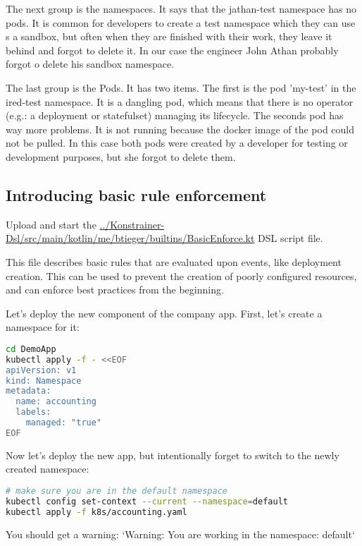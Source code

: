 The next group is the namespaces. It says that the jathan-test namespace has no pods. It is common for developers to create a test namespace which they can use s a sandbox, but often when they are finished with their work, they leave it behind and forgot to delete it. In our case the engineer John Athan probably forgot o delete his sandbox namespace.

The last group is the Pods. It has two items. The first is the pod 'my-test' in the ired-test namespace. It is a dangling pod, which means that there is no operator (e.g.: a deployment or statefulset) managing its lifecycle. The seconds pod has way more problems. It is not running because the docker image of the pod could not be pulled. In this case both pods were created by a developer for testing or development purposes, but she forgot to delete them.

\subsection{Introducing basic rule enforcement}

Upload and start the \url{../Konstrainer-Dsl/src/main/kotlin/me/btieger/builtins/BasicEnforce.kt} DSL script file.

This file describes basic rules that are evaluated upon events, like deployment creation. This can be used to prevent the creation of poorly configured resources, and can enforce best practices from the beginning.

Let's deploy the new component of the company app. First, let's create a namespace for it:

\begin{lstlisting}[caption={TODO},language=bash,label=code:bashx]
cd DemoApp
kubectl apply -f - <<EOF
apiVersion: v1
kind: Namespace
metadata:
  name: accounting
  labels:
    managed: "true"
EOF
\end{lstlisting}

Now let's deploy the new app, but intentionally forget to switch to the newly created namespace:

\begin{lstlisting}[caption={TODO},language=bash,label=code:bashx]
# make sure you are in the default namespace
kubectl config set-context --current --namespace=default
kubectl apply -f k8s/accounting.yaml
\end{lstlisting}

You should get a warning: `Warning: You are working in the namespace: default`

